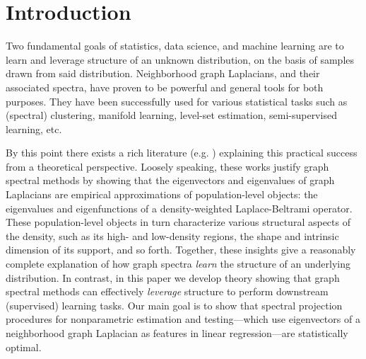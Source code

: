 \section{Introduction}
\label{sec:introduction}
Two fundamental goals of statistics, data science, and machine learning are to learn and leverage structure of an unknown distribution, on the basis of samples drawn from said distribution. Neighborhood graph Laplacians, and their associated spectra, have proven to be powerful and general tools for both purposes. They have been successfully used for various statistical tasks such as (spectral) clustering, manifold learning, level-set estimation, semi-supervised learning, etc.

By this point there exists a rich literature (e.g. \citep{koltchinskii2000,belkin07,vonluxburg2008,burago2014,shi2015,singer2017,garciatrillos18,trillos2019, calder2019, cheng2021,dunson2021}) explaining this practical success from a theoretical perspective. Loosely speaking, these works justify graph spectral methods by showing that the eigenvectors and eigenvalues of graph Laplacians are empirical approximations of population-level objects: the eigenvalues and eigenfunctions of a density-weighted Laplace-Beltrami operator. These population-level objects in turn characterize various structural aspects of the density, such as its high- and low-density regions, the shape and intrinsic dimension of its support, and so forth. Together, these insights give a reasonably complete explanation of how graph spectra \emph{learn} the structure of an underlying distribution. In contrast, in this paper we develop theory showing that graph spectral methods can effectively \emph{leverage} structure to perform downstream (supervised) learning tasks. Our main goal is to show that spectral projection procedures for nonparametric estimation and testing---which use eigenvectors of a neighborhood graph Laplacian as features in linear regression---are statistically optimal. 

